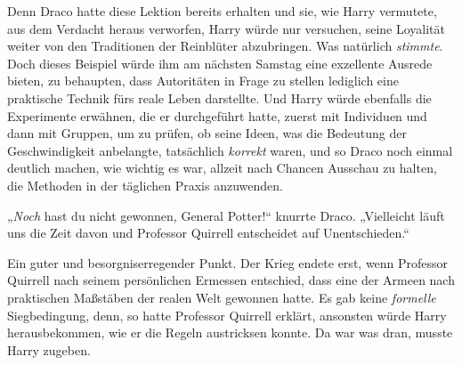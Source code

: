 Denn Draco hatte diese Lektion bereits erhalten und sie, wie Harry vermutete, aus dem Verdacht heraus verworfen, Harry würde nur versuchen, seine Loyalität weiter von den Traditionen der Reinblüter abzubringen. Was natürlich \emph{stimmte}. Doch dieses Beispiel würde ihm am nächsten Samstag eine exzellente Ausrede bieten, zu behaupten, dass Autoritäten in Frage zu stellen lediglich eine praktische Technik fürs reale Leben darstellte. Und Harry würde ebenfalls die Experimente erwähnen, die er durchgeführt hatte, zuerst mit Individuen und dann mit Gruppen, um zu prüfen, ob seine Ideen, was die Bedeutung der Geschwindigkeit anbelangte, tatsächlich \emph{korrekt} waren, und so Draco noch einmal deutlich machen, wie wichtig es war, allzeit nach Chancen Ausschau zu halten, die Methoden in der täglichen Praxis anzuwenden.

„\emph{Noch} hast du nicht gewonnen, General Potter!“ knurrte Draco.
„Vielleicht läuft uns die Zeit davon und Professor Quirrell entscheidet auf Unentschieden.“

Ein guter und besorgniserregender Punkt. Der Krieg endete erst, wenn Professor Quirrell nach seinem persönlichen Ermessen entschied, dass eine der Armeen nach praktischen Maßstäben der realen Welt gewonnen hatte. Es gab keine \emph{formelle} Siegbedingung, denn, so hatte Professor Quirrell erklärt, ansonsten würde Harry herausbekommen, wie er die Regeln austricksen konnte. Da war was dran, musste Harry zugeben.

